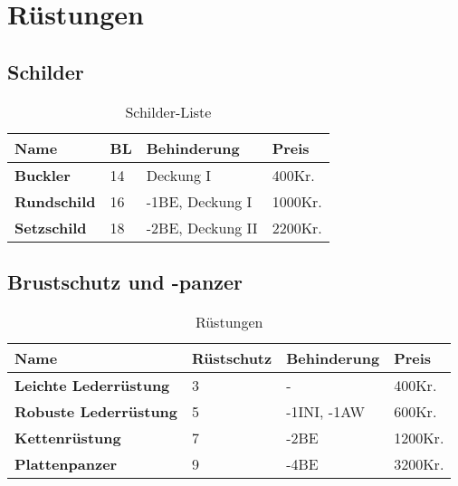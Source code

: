 {\let\clearpage\relax\chapter{Rüstungen}}

\section{Schilder}
\begin{table}[h]
\begin{tabular}{|p{5cm}|p{3cm}|p{4cm}|p{2cm}|}
\hline
\textbf{Name} & \textbf{BL} & \textbf{Behinderung} & \textbf{Preis} \\

\hline
\textbf{Buckler} & 14 & Deckung I & 400Kr. \\

\hline
\textbf{Rundschild} & 16 & -1BE, Deckung I & 1000Kr. \\

\hline
\textbf{Setzschild} & 18 & -2BE, Deckung II & 2200Kr. \\

\hline
\end{tabular}
\caption{Schilder-Liste}
\label{tab:Schilder}
\end{table}


\section{Brustschutz und -panzer}
\begin{table}[h]
\begin{tabular}{|p{5cm}|p{3cm}|p{4cm}|p{2cm}|}
\hline
\textbf{Name} & \textbf{Rüstschutz} & \textbf{Behinderung} & \textbf{Preis} \\

\hline
\textbf{Leichte Lederrüstung} & 3 & - & 400Kr. \\

\hline
\textbf{Robuste Lederrüstung} & 5 & -1INI, -1AW & 600Kr. \\

\hline
\textbf{Kettenrüstung} & 7 & -2BE & 1200Kr. \\

\hline
\textbf{Plattenpanzer} & 9 & -4BE & 3200Kr. \\

\hline
\end{tabular}
\caption{Rüstungen}
\label{tab:Rüstungen}
\end{table}